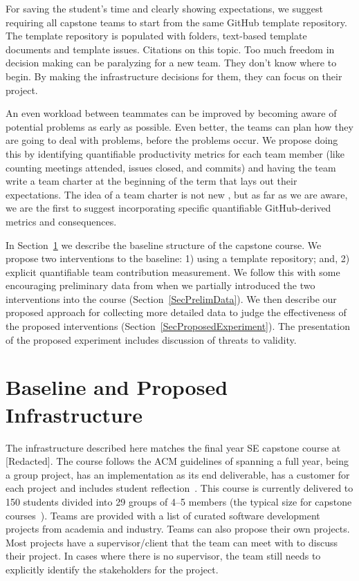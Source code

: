 \documentclass[10pt, conference]{IEEEtran}
\begin{document}
For saving the student's time and clearly showing expectations, we suggest
requiring all capstone teams to start from the same GitHub template repository.
The template repository is populated with folders, text-based template documents
and template issues.  Citations on this topic. Too much freedom in decision
making can be paralyzing for a new team.  They don't know where to begin.  By
making the infrastructure decisions for them, they can focus on their project.

An even workload between teammates can be improved by becoming aware of
potential problems as early as possible. Even better, the teams can plan how
they are going to deal with problems, before the problems occur.  We propose
doing this by identifying quantifiable productivity metrics for each team member
(like counting meetings attended, issues closed, and commits) and having the
team write a team charter at the beginning of the term that lays out their
expectations.  The idea of a team charter is not new
\cite{mathieuLayingFoundationSuccessful2009, johnsonTeamChartersHelp2022,
hughstonEmpiricalStudyTeam2013}, but as far as we are aware, we are the first to
suggest incorporating specific quantifiable GitHub-derived metrics and
consequences.

In Section~\ref{SecInfrastruct} we describe the baseline structure of the
capstone course.  We propose two interventions to the baseline: 1) using a
template repository; and, 2) explicit quantifiable team contribution
measurement. We follow this with some encouraging preliminary data from when we
partially introduced the two interventions into the course
(Section~\ref{SecPrelimData}).  We then describe our proposed approach for
collecting more detailed data to judge the effectiveness of the proposed
interventions (Section~\ref{SecProposedExperiment}). The presentation of the
proposed experiment includes discussion of threats to validity.

\section{Baseline and Proposed Infrastructure} \label{SecInfrastruct}

The infrastructure described here matches the final year SE capstone course at
[Redacted]. %
The course follows the ACM guidelines of spanning a full year, being a group
project, has an implementation as its end deliverable, has a customer for each
project and includes student reflection~\cite{ACM2015}.  This course is
currently delivered to 150 students divided into 29 groups of 4--5 members (the
typical size for capstone
courses~\cite{tenhunenSystematicLiteratureReview2023}).  Teams are provided with
a list of curated software development projects from academia and industry.
Teams can also propose their own projects.  Most projects have a
supervisor/client that the team can meet with to discuss their project.  In
cases where there is no supervisor, the team still needs to explicitly identify
the stakeholders for the project.
\end{document}
